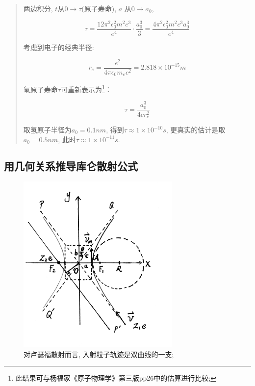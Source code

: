 \begin{quote}
两边积分, $t$从$0 \to \tau$(原子寿命), $a$ 从$0 \to a_0$,

\begin{equation*}
\tau = \frac{12 \pi^2 \epsilon_0^2 m^2 c^3}{e^4} \cdot
\frac{a_0^3}{3} = \frac{4 \pi^2 \epsilon_0^2 m^2 c^3 a_0^3}{e^4}
\end{equation*}


考虑到电子的经典半径:

\begin{equation*}
r_e = \frac{e^2}{4 \pi \epsilon_0 m_e c^2} = 2.818 \times 10^{-15} m
\end{equation*}

氢原子寿命$\tau$可重新表示为\footnote{此结果可与杨福家《原子物理学》第三版pp26中的估算进行比较;}：

\begin{equation*}
\tau = \frac{a_0^3}{4 c r_e^2}
\end{equation*}

取氢原子半径为$a_0 = 0.1 nm$, 得到$\tau \approx 1 \times 10^{-10}
s$, 更真实的估计是取$a_0 = 0.5 nm$, 此时$\tau \approx 1 \times
10^{-11} s$.

\end{quote}


\subsection{用几何关系推导库仑散射公式}

\begin{figure}[h]
\begin{center}
\includegraphics[clip,width=8cm]{AtomIdea/1-7.ps}
\caption{对卢瑟福散射而言, 入射粒子轨迹是双曲线的一支;}
\end{center}
\end{figure}


